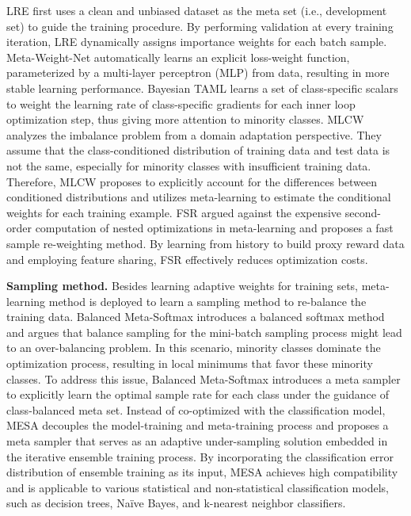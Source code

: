 LRE \cite{ren2018learning} first uses a clean and unbiased dataset as the meta set (i.e., development set) to guide the training procedure. By performing validation at every training iteration, LRE dynamically assigns importance weights for each batch sample.
Meta-Weight-Net \cite{shu2019meta} automatically learns an explicit loss-weight function, parameterized by a multi-layer perceptron (MLP) from data, resulting in more stable learning performance. 
Bayesian TAML \cite{lee2020l2b} learns a set of class-specific scalars to weight the learning rate of class-specific gradients for each inner loop optimization step, thus giving more attention to minority classes. 
MLCW \cite{jamal2020rethinking} analyzes the imbalance problem from a domain adaptation perspective. They assume that the class-conditioned distribution of training data and test data is not the same, especially for minority classes with insufficient training data. Therefore, MLCW proposes to explicitly account for the differences between conditioned distributions and utilizes meta-learning to estimate the conditional weights for each training example. 
FSR \cite{zhang2021learning} argued against the expensive second-order computation of nested optimizations in meta-learning and proposes a fast sample re-weighting method. By learning from history to build proxy reward data and employing feature sharing, FSR effectively reduces optimization costs.

\textbf{Sampling method.}
Besides learning adaptive weights for training sets, meta-learning method is deployed to learn a sampling method to re-balance the training data. Balanced Meta-Softmax \cite{ren2020balanced} introduces a balanced softmax method and argues that balance sampling for the mini-batch sampling process might lead to an over-balancing problem. In this scenario, minority classes dominate the optimization process, resulting in local minimums that favor these minority classes. To address this issue, Balanced Meta-Softmax introduces a meta sampler to explicitly learn the optimal sample rate for each class under the guidance of class-balanced meta set.
Instead of co-optimized with the classification model, MESA \cite{liu2020mesa} decouples the model-training and meta-training process and proposes a meta sampler that serves as an adaptive under-sampling solution embedded in the iterative ensemble training process. By incorporating the classification error distribution of ensemble training as its input, MESA achieves high compatibility and is applicable to various statistical and non-statistical classification models, such as decision trees, Naïve Bayes, and k-nearest neighbor classifiers.


